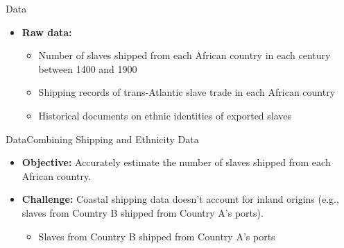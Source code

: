 \documentclass[dvipsnames,hyperref={pdfpagelabels=false}]{beamer}
\begin{document}
\begin{frame}{Data}

\begin{itemize}
\item \textbf{Raw data:}
							\vspace{0.2cm}
\begin{itemize}
	\item Number of slaves shipped from each African country in each century between 1400 and 1900
							\vspace{0.2cm}
	\item Shipping records of trans-Atlantic slave trade in each African country 
							\vspace{0.2cm}
	\item Historical documents on ethnic identities of exported slaves
\end{itemize}
\end{itemize}
\end{frame}



\begin{frame}{Data}{Combining Shipping and Ethnicity Data}
\begin{itemize}
	\item \textbf{Objective:} Accurately estimate the number of slaves shipped from each African country.
								\vspace{0.2cm}
	\item \textbf{Challenge:} Coastal shipping data doesn't account for inland origins (e.g., slaves from Country B shipped from Country A's ports).
	\begin{itemize}
									\vspace{0.2cm}
		\item Slaves from Country B shipped from Country A's ports
	
	\end{itemize}
\end{itemize}
\end{frame}
\end{document}
